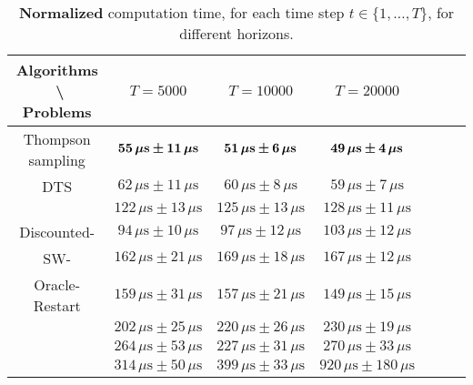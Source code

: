 \begin{small} %
\begin{table}[ht]
    \begin{small} %
    \centering
    \begin{tabular}{c|cccccc}
    \textbf{Algorithms} $\;$ \textbackslash $\;$ \textbf{Problems} & $T=5000$ & $T=10000$ & $T=20000$ \\
        \hline
        Thompson sampling & $\boldsymbol{55 \,\mu\text{\textbf{s}} \pm 11\, \mu\text{\textbf{s}}}$ & $\boldsymbol{51 \,\mu\text{\textbf{s}} \pm 6\, \mu\text{\textbf{s}}}$ & $\boldsymbol{49 \,\mu\text{\textbf{s}} \pm 4 \,\mu\text{\textbf{s}}}$ \\
        DTS & $62 \,\mu\text{s} \pm 11 \,\mu\text{s}$ & $60 \,\mu\text{s} \pm 8\, \mu\text{s}$ & $59 \,\mu\text{s} \pm 7 \,\mu\text{s}$ \\
        \hline
        \klUCB{} & $122 \,\mu\text{s} \pm 13 \,\mu\text{s}$ & $125 \,\mu\text{s} \pm 13 \,\mu\text{s}$ & $128 \,\mu\text{s} \pm 11 \,\mu\text{s}$ \\
        Discounted-\klUCB{} & $94 \,\mu\text{s} \pm 10 \,\mu\text{s}$ & $97 \,\mu\text{s} \pm 12 \,\mu\text{s}$ & $103 \,\mu\text{s} \pm 12 \,\mu\text{s}$ \\
        SW-\klUCB{} & $162 \,\mu\text{s} \pm 21 \,\mu\text{s}$ & $169 \,\mu\text{s} \pm 18 \,\mu\text{s}$ & $167 \,\mu\text{s} \pm 12 \,\mu\text{s}$ \\
        \hline
        Oracle-Restart \klUCB{} & $159 \,\mu\text{s} \pm 31 \,\mu\text{s}$ & $157 \,\mu\text{s} \pm 21 \,\mu\text{s}$ & $149 \,\mu\text{s} \pm 15 \,\mu\text{s}$ \\
        \hline
        \MklUCB{} & $202 \,\mu\text{s} \pm 25 \,\mu\text{s}$ & $220 \,\mu\text{s} \pm 26 \,\mu\text{s}$ & $230 \,\mu\text{s} \pm 19 \,\mu\text{s}$ \\
        \CUSUMklUCB{} & $264 \,\mu\text{s} \pm 53 \,\mu\text{s}$ & $227 \,\mu\text{s} \pm 31 \,\mu\text{s}$ & $270 \,\mu\text{s} \pm 33 \,\mu\text{s}$ \\
        \GLRklUCB{} & $314 \,\mu\text{s} \pm 50 \,\mu\text{s}$ & $399 \,\mu\text{s} \pm 33 \,\mu\text{s}$ & $920 \,\mu\text{s} \pm 180 \,\mu\text{s}$ \\

    \end{tabular}
    \caption{\textbf{Normalized} computation time, for each time step $t\in\{1,\dots,T\}$, for different horizons.}
    \label{table:6:TimeCosts}
    \end{small} %
\end{table}
\end{small} %

